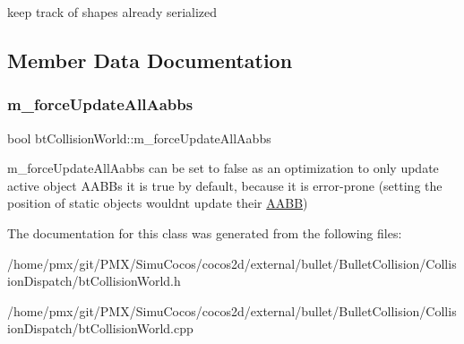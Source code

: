 keep track of shapes already serialized 

\subsection{Member Data Documentation}
\mbox{\label{classbtCollisionWorld_a91b110fc2501b965cdcaa2a6e1d89999}} 
\subsubsection{\texorpdfstring{m\+\_\+force\+Update\+All\+Aabbs}{m\_forceUpdateAllAabbs}}
{\footnotesize\ttfamily bool bt\+Collision\+World\+::m\+\_\+force\+Update\+All\+Aabbs\hspace{0.3cm}{\ttfamily [protected]}}

m\+\_\+force\+Update\+All\+Aabbs can be set to false as an optimization to only update active object A\+A\+B\+Bs it is true by default, because it is error-\/prone (setting the position of static objects wouldn\textquotesingle{}t update their \hyperlink{classAABB}{A\+A\+BB}) 

The documentation for this class was generated from the following files\+:\begin{DoxyCompactItemize}
\item 
/home/pmx/git/\+P\+M\+X/\+Simu\+Cocos/cocos2d/external/bullet/\+Bullet\+Collision/\+Collision\+Dispatch/bt\+Collision\+World.\+h\item 
/home/pmx/git/\+P\+M\+X/\+Simu\+Cocos/cocos2d/external/bullet/\+Bullet\+Collision/\+Collision\+Dispatch/bt\+Collision\+World.\+cpp\end{DoxyCompactItemize}
